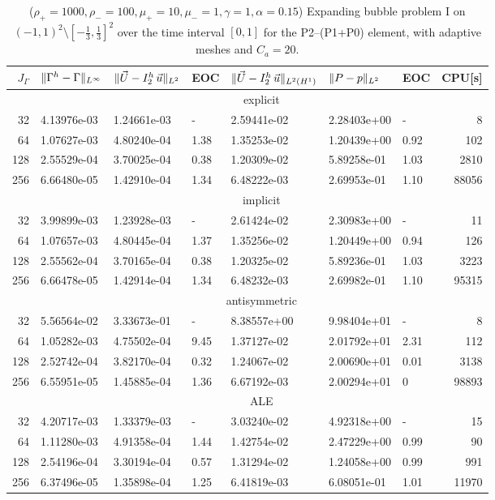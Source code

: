 \begin{table}
\center
\hspace*{-3.25cm}
\begin{tabular}{rllllllr}
\hline
$J_\Gamma$ & $\|\Gamma^h - \Gamma\|_{L^\infty}$ & $\|\vec U - I^h_{2}\,\vec u\|_{L^2}$ & EOC & $\|\vec U - I^h_{2}\,\vec u\|_{L^2(H^1)}$ & $\|P - p\|_{L^2}$ & EOC
& CPU[s] \\
\hline
& \multicolumn{7}{c}{explicit} \\
\hline
 32 & 4.13976e-03 & 1.24661e-03 &    - & 2.59441e-02 & 2.28403e+00 &    - &
8 \\
 64 & 1.07627e-03 & 4.80240e-04 & 1.38 & 1.35253e-02 & 1.20439e+00 & 0.92 &
102 \\
128 & 2.55529e-04 & 3.70025e-04 & 0.38 & 1.20309e-02 & 5.89258e-01 & 1.03 &
2810 \\
256 & 6.66480e-05 & 1.42910e-04 & 1.34 & 6.48222e-03 & 2.69953e-01 & 1.10 &
88056 \\
\hline
& \multicolumn{7}{c}{implicit} \\
\hline
 32 & 3.99899e-03 & 1.23928e-03 &    - & 2.61424e-02 & 2.30983e+00 &    - &
11 \\
 64 & 1.07657e-03 & 4.80445e-04 & 1.37 & 1.35256e-02 & 1.20449e+00 & 0.94 &
126 \\
128 & 2.55562e-04 & 3.70165e-04 & 0.38 & 1.20325e-02 & 5.89236e-01 & 1.03 &
3223 \\
256 & 6.66478e-05 & 1.42914e-04 & 1.34 & 6.48232e-03 & 2.69982e-01 & 1.10 &
95315 \\
\hline
& \multicolumn{7}{c}{antisymmetric} \\
\hline
 32 & 5.56564e-02 & 3.33673e-01 &    - & 8.38557e+00 & 9.98404e+01 &    - &
8 \\
 64 & 1.05282e-03 & 4.75502e-04 & 9.45 & 1.37127e-02 & 2.01792e+01 & 2.31 &
112 \\
128 & 2.52742e-04 & 3.82170e-04 & 0.32 & 1.24067e-02 & 2.00690e+01 & 0.01 &
3138 \\
256 & 6.55951e-05 & 1.45885e-04 & 1.36 & 6.67192e-03 & 2.00294e+01 &    0 &
98893 \\
\hline
& \multicolumn{7}{c}{ALE} \\
\hline
 32 & 4.20717e-03 & 1.33379e-03 &    - & 3.03240e-02 & 4.92318e+00 &    - &
15 \\
 64 & 1.11280e-03 & 4.91358e-04 & 1.44 & 1.42754e-02 & 2.47229e+00 & 0.99 &
90 \\
128 & 2.54196e-04 & 3.30194e-04 & 0.57 & 1.31294e-02 & 1.24058e+00 & 0.99 &
991 \\
256 & 6.37496e-05 & 1.35898e-04 & 1.25 & 6.41819e-03 & 6.08051e-01 & 1.01 &
11970 \\
\hline
\end{tabular}
\hspace*{-3.25cm}
\caption[Navier--Stokes expanding bubble III errors P2--(P1+P0)]
{($\rho_+ = 1000,\rho_- = 100,\mu_+ = 10,\mu_- =1,\gamma = 1,\alpha=0.15$)
Expanding bubble problem I on $(-1,1)^2\setminus[-\frac{1}{3},\frac{1}{3}]^2$
over the time interval $[0,1]$ for the P2--(P1+P0) element, with adaptive
meshes and $C_a=20$\textdegree.}
\label{tab:nsexpandingbubbleIIIp2pip0}
\end{table}

